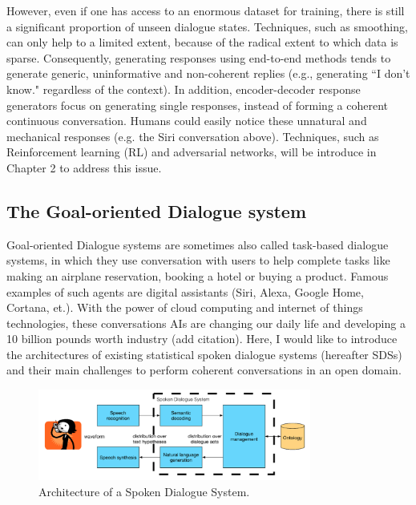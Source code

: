\documentclass[bsc,frontabs,twoside,singlespacing,parskip,deptreport]{infthesis}     %
\begin{document}
However, even if one has access to an enormous dataset for training, there is still a significant proportion of unseen dialogue states. Techniques, such as smoothing, can only help to a limited extent, because of the radical extent to which data is sparse. Consequently, generating responses using end-to-end methods tends to generate generic, uninformative and non-coherent replies (e.g., generating ``I don’t know." regardless of the context). In addition, encoder-decoder response generators focus on generating single responses, instead of forming a coherent continuous conversation\cite{jurafsky2019speech}. Humans could easily notice these unnatural and mechanical responses (e.g. the Siri conversation above). Techniques, such as Reinforcement learning (RL) and adversarial networks, will be introduce in Chapter 2 to address this issue\cite{li2017adversarial}\cite{li2016deep}.

\subsection{The Goal-oriented Dialogue system}

 Goal-oriented Dialogue systems are sometimes also called task-based dialogue systems, in which they use conversation with users to help complete tasks like making an airplane reservation, booking a hotel or buying a product. Famous examples of such agents are digital assistants (Siri, Alexa, Google Home, Cortana, et.). With the power of cloud computing and internet of things technologies, these conversations AIs are changing our daily life and developing a 10 billion pounds worth industry (add citation). Here, I would like to introduce the architectures of existing statistical spoken dialogue systems (hereafter SDSs) and their main challenges to perform coherent conversations in an open domain. 

\begin{figure}[h]
    \centering
    \includegraphics[width=0.80\textwidth]{sds.png}
    \caption{Architecture of a Spoken Dialogue System.\cite{gasic}}
    \label{fig:sds}
\end{figure}
\end{document}
